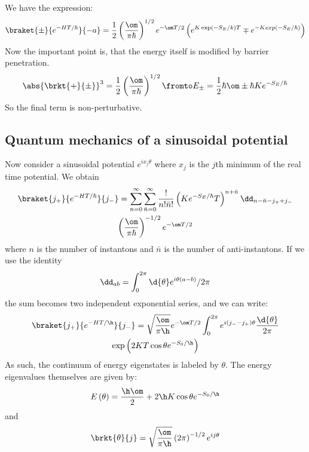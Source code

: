 \documentclass{booc}
\begin{document}
We have the expression:
\begin{equation}
\braket{\pm }{e^{-HT / \hbar}}{-a} = 
\frac{1}{2}\left( \frac{\om}{\pi \hbar} \right)^{1/2}
e^{-\om T / 2}\left( 
e^{K\exp\left(-S_E / k\right)T} \mp e^{-Kexp\left( -S_E / \hbar \right)}\right)
\end{equation}
Now the important point is, that the energy itself is modified by
barrier penetration.
\begin{equation}
\abs{\brkt{+}{\pm}}^3 = \frac{1}{2}\left( \frac{\om}{\pi \hbar} \right)^{1/2}
\fromto E_{\pm} = \frac{1}{2} \hbar \om \pm \hbar Ke^{-S_E/\hbar}
\end{equation}
So the final term is non-perturbative.

\subsection{Quantum mechanics of a sinusoidal potential}

Now consider a sinusoidal potential $e^{ix_j \theta}$ where $x_j$ is the $j$th
minimum of the real time potential. 
We obtain
\begin{multline}
\braket{j_+}{e^{-HT / \hbar}}{j_-} = 
\sum_{n = 0}^\infty \sum_{\bar n = 0}^\infty
\frac{!}{n! \bar n!}
\left( K e^{-S_E / \hbar} T \right)^{n + \bar n} \dd_{n - \bar n - j_+ + j_-}
\\
\left( \frac{\om}{\pi\hbar} \right)^{-1/2} e^{-\om T/2}
\end{multline}
where $n$ is the number of instantons and $\bar n$ is the number of 
anti-instantons. If we use the identity
\begin{equation}
\dd_{ab} = \int_0^{2\pi} \d{\theta} e^{i\theta \left( a-b \right)} / 2\pi
\end{equation}
the sum becomes two independent exponential series, and we can write:
\begin{multline}
\braket{j_+}{e^{-HT / \h}}{j_-} =
\sqrt{
\frac{\om}{\pi \h}} e^{-\om T / 2}
\int_0^{2\pi} e^{i\left( j_- - j_+ \right)\theta}
\frac{\d{\theta}}{2\pi}  \\
\exp\left( 2KT \cos\theta e^{-S_0 / \h}\right)
\end{multline}
As such, the continuum of energy eigenstates is labeled by $\theta$.
The energy eigenvalues themselves are given by:
\begin{equation}
E\left( \theta \right) = \frac{\h \om}{2} + 2\h K \cos \theta e^{-S_0 / \h}
\end{equation}
and
\begin{equation}
\brkt{\theta}{j} = \sqrt{\frac{\om}{\pi \h}}
\left( 2\pi \right)^{-1/2} e^{ij\theta}
\end{equation}
\end{document}

